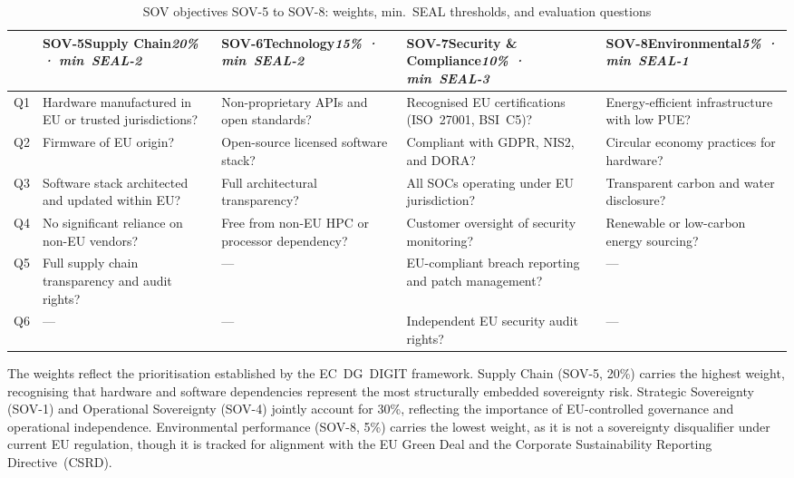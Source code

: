 \begin{table}[htbp]
\centering
\footnotesize
\renewcommand{\arraystretch}{1.25}
\caption{SOV objectives SOV-5 to SOV-8: weights, min.\ SEAL thresholds, and evaluation questions}
\label{tab:sov_objectives_b}
\begin{tabularx}{\linewidth}{|c|X|X|X|X|}
\hline
 &
\textbf{SOV-5}\newline Supply Chain\newline \textit{20\% · min~SEAL-2} &
\textbf{SOV-6}\newline Technology\newline \textit{15\% · min~SEAL-2} &
\textbf{SOV-7}\newline Security \& Compliance\newline \textit{10\% · min~SEAL-3} &
\textbf{SOV-8}\newline Environmental\newline \textit{5\% · min~SEAL-1} \\
\hline\hline
Q1 &
Hardware manufactured in EU or trusted jurisdictions? &
Non-proprietary APIs and open standards? &
Recognised EU certifications (ISO~27001, BSI~C5)? &
Energy-efficient infrastructure with low PUE? \\
\hline
Q2 &
Firmware of EU origin? &
Open-source licensed software stack? &
Compliant with GDPR, NIS2, and DORA? &
Circular economy practices for hardware? \\
\hline
Q3 &
Software stack architected and updated within EU? &
Full architectural transparency? &
All SOCs operating under EU jurisdiction? &
Transparent carbon and water disclosure? \\
\hline
Q4 &
No significant reliance on non-EU vendors? &
Free from non-EU HPC or processor dependency? &
Customer oversight of security monitoring? &
Renewable or low-carbon energy sourcing? \\
\hline
Q5 &
Full supply chain transparency and audit rights? &
--- &
EU-compliant breach reporting and patch management? &
--- \\
\hline
Q6 &
--- &
--- &
Independent EU security audit rights? &
--- \\
\hline
\end{tabularx}
\end{table}

The weights reflect the prioritisation established by the EC~DG~DIGIT framework. Supply Chain (SOV-5, 20\%) carries the highest weight, recognising that hardware and software dependencies represent the most structurally embedded sovereignty risk. Strategic Sovereignty (SOV-1) and Operational Sovereignty (SOV-4) jointly account for 30\%, reflecting the importance of EU-controlled governance and operational independence. Environmental performance (SOV-8, 5\%) carries the lowest weight, as it is not a sovereignty disqualifier under current EU regulation, though it is tracked for alignment with the EU Green Deal and the Corporate Sustainability Reporting Directive~(CSRD).

